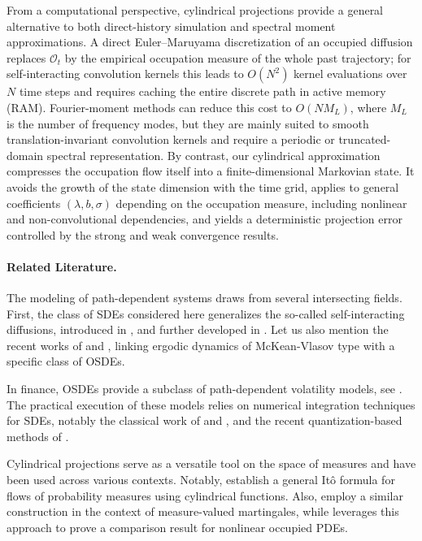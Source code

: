 \documentclass[11pt]{article}
\numberwithin{equation}{section}
\theoremstyle{plain}
\theoremstyle{definition}
\newcommand{\rr}[1]{\textcolor{red}{#1}}
\begin{document}
From a computational perspective, cylindrical projections provide a general alternative
to both direct-history simulation and spectral moment approximations. A direct
Euler--Maruyama discretization of an occupied diffusion replaces \(\mathcal{O}_t\) by the empirical
occupation measure of the whole past trajectory; for self-interacting convolution kernels
this leads to \(O(N^2)\) kernel evaluations over \(N\) time steps and requires caching the entire discrete path in active memory (RAM). %
Fourier-moment methods can reduce this cost to \(O(N M_L)\), where \(M_L\) is
the number of frequency modes, but they are mainly suited to smooth translation-invariant
convolution kernels and require a periodic or truncated-domain spectral representation.
By contrast, our cylindrical approximation compresses the occupation flow itself into a
finite-dimensional Markovian state. It avoids the growth of the state dimension with the
time grid, applies to general coefficients \((\lambda,b,\sigma)\) depending on the
occupation measure, including nonlinear and non-convolutional dependencies, and yields
a deterministic projection error controlled by the strong and weak convergence results. 



\paragraph{Related Literature. }   
The modeling of path-dependent systems draws from several intersecting fields. First, the class of SDEs considered here generalizes the so-called self-interacting  diffusions, introduced in  \citet{CranstonLeJan,Raimond}, and  further developed in \cite{Benaim1, Benaim2, Benaim3, Benaim4}. Let us also mention the recent works of  \citet{DuJiangLi} and \citet{ChassagneuxPages},  linking  ergodic dynamics of McKean-Vlasov type with  a specific class of OSDEs. 

In finance, OSDEs provide a subclass of  path-dependent volatility models, see  \citet{Guyon2014, GuyonSlides, GuyonLekeufack}. The practical execution of these models relies on numerical integration techniques for SDEs, notably the classical work of \citet{KloedenPlaten} and \citet{GuyonHL}, and the recent quantization-based methods of \citet{GrasselliPages}. 

Cylindrical projections serve as a versatile tool on the space of measures and have been used across various contexts. Notably, \citet{GuoPhamWei} establish a general It\^o formula for flows of probability measures using cylindrical functions. Also,  
\citet{Larsson} employ a similar construction in the context of measure-valued martingales, while \citet{SonerTissotZhang} leverages this approach to prove a comparison result for  nonlinear occupied PDEs.
\end{document}
